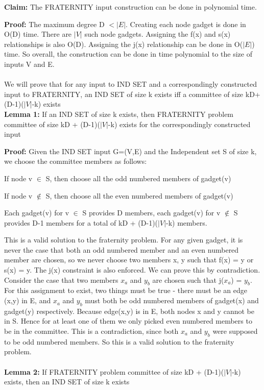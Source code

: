 \textbf{Claim:} The FRATERNITY input construction can be done in polynomial time.

\textbf{Proof:} The maximum degree D $< |E|$.
Creating each node gadget is done in O(D) time. There are $|V|$ such node gadgets. Assigning the f(x) and s(x) relationships is also O(D). Assigning the j(x) relationship can be done in O($|E|$) time. So overall, the construction can be done in time polynomial to the size of inputs V and E.\\
\\
We will prove that for any input to IND SET and a correspondingly constructed input to FRATERNITY, an IND SET of size k exists iff a committee of size kD+(D-1)($|V|$-k) exists
\\

\textbf{Lemma 1:} If an IND SET of size k exists, then FRATERNITY problem committee of size kD + (D-1)($|V|$-k) exists for the correspondingly constructed input

\textbf{Proof:}
Given the IND SET input G=(V,E) and the Independent set S of size k, we choose the committee members as follows:

If node v $\in$ S, then choose all the odd numbered members of gadget(v)

If node v $\notin$ S, then choose all the even numbered members of gadget(v)

Each gadget(v) for v $\in$ S provides D members, each gadget(v) for v $\notin$ S provides D-1 members for a total of kD + (D-1)($|V|$-k) members.

This is a valid solution to the fraternity problem. For any given gadget, it is never the case that both an odd numbered member and an even numbered member are chosen, so we never choose two members x, y such that f(x) = y or s(x) = y. The j(x) constraint is also enforced. We can prove this by contradiction. Consider the case that two members $x_a$ and $y_b$ are chosen such that j($x_a$) = $y_b$. For this assignment to exist, two things must be true - there must be an edge (x,y) in E, and $x_a$ and $y_b$ must both be odd numbered members of gadget(x) and gadget(y) respectively. Because edge(x,y) is in E, both nodes x and y cannot be in S. Hence for at least one of them we only picked even numbered members to be in the committee. This is a contradiction, since both $x_a$ and $y_b$ were supposed to be odd numbered members. So this is a valid solution to the fraternity problem.\\
\\
\textbf{Lemma 2:} If FRATERNITY problem committee of size kD + (D-1)($|V|$-k) exists, then an IND SET of size k exists

